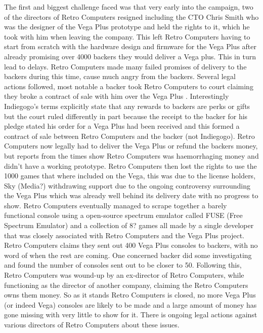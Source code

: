 The first and biggest challenge faced was that very early into the campaign, two of the directors of Retro Computers resigned including the CTO Chris Smith who was the designer of the Vega Plus prototype and held the rights to it, which he took with him when leaving the company. This left Retro Computers having to start from scratch with the hardware design and firmware for the Vega Plus after already promising over 4000 backers they would deliver a Vega plus. This in turn lead to delays. Retro Computers made many failed promises of delivery to the backers during this time, cause much angry from the backers. Several legal actions followed, most notable a backer took Retro Computers to court claiming they broke a contract of sale with him over the Vega Plus 
\cite{RN122}. Interestingly Indiegogo's terms explicitly state that any rewards to backers are perks or gifts but the court ruled differently in part because the receipt to the backer for his pledge stated his order for a Vega Plus had been received and this formed a contract of sale between Retro Computers and the backer (not Indiegogo). Retro Computers now legally had to deliver the Vega Plus or refund the backers money, but reports from the times show Retro Computers was haemorrhaging money and didn't have a working prototype. Retro Computers then lost the rights to use the 1000 games that where included on the Vega, this was due to the license holders, Sky (Media?) withdrawing support due to the ongoing controversy surrounding the Vega Plus which was already well behind its delivery date with no progress to show. Retro Computers eventually managed to scrape together a barely functional console using a open-source spectrum emulator called FUSE (Free Spectrum Emulator) and a collection of 8? games all made by a single developer that was closely associated with Retro Computers and the Vega Plus project. Retro Computers claims they sent out 400 Vega Plus consoles to backers, with no word of when the rest are coming. One concerned backer did some investigating and found the number of consoles sent out to be closer to 50. Following this, Retro Computers was wound-up by an ex-director of Retro Computers, while functioning as the director of another company, claiming the Retro Computers owns them money. So as it stands Retro Computers is closed, no more Vega Plus (or indeed Vega) consoles are likely to be made and a large amount of money has gone missing with very little to show for it. There is ongoing legal actions against various directors of Retro Computers about these issues.\\

